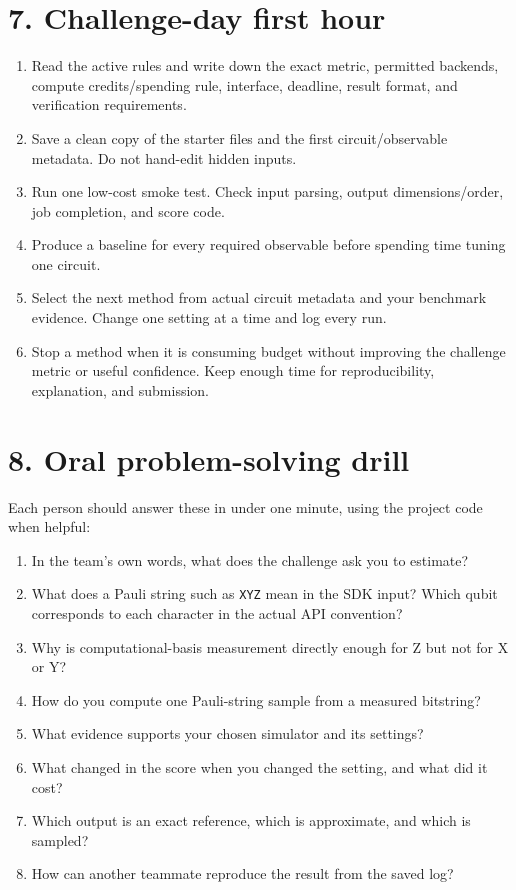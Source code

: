 \documentclass[11pt,letterpaper]{article}
\begin{document}
\section*{7. Challenge-day first hour}
\begin{enumerate}
  \item Read the active rules and write down the exact metric, permitted backends, compute credits/spending rule, interface, deadline, result format, and verification requirements.
  \item Save a clean copy of the starter files and the first circuit/observable metadata. Do not hand-edit hidden inputs.
  \item Run one low-cost smoke test. Check input parsing, output dimensions/order, job completion, and score code.
  \item Produce a baseline for every required observable before spending time tuning one circuit.
  \item Select the next method from actual circuit metadata and your benchmark evidence. Change one setting at a time and log every run.
  \item Stop a method when it is consuming budget without improving the challenge metric or useful confidence. Keep enough time for reproducibility, explanation, and submission.
\end{enumerate}

\section*{8. Oral problem-solving drill}
Each person should answer these in under one minute, using the project code when helpful:
\begin{enumerate}
  \item In the team's own words, what does the challenge ask you to estimate?
  \item What does a Pauli string such as \texttt{XYZ} mean in the SDK input? Which qubit corresponds to each character in the actual API convention?
  \item Why is computational-basis measurement directly enough for Z but not for X or Y?
  \item How do you compute one Pauli-string sample from a measured bitstring?
  \item What evidence supports your chosen simulator and its settings?
  \item What changed in the score when you changed the setting, and what did it cost?
  \item Which output is an exact reference, which is approximate, and which is sampled?
  \item How can another teammate reproduce the result from the saved log?
\end{enumerate}
\end{document}
